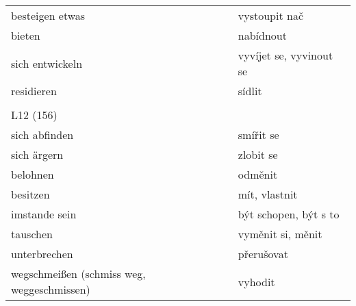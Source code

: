\documentclass{article}
\begin{document}
\begin{tabular}{ p{5cm}|p{5cm}  }
    besteigen etwas & vystoupit nač \\
    bieten & nabídnout \\
    sich entwickeln & vyvíjet se, vyvinout se \\
    residieren & sídlit \\
    \\
    L12 (156) \\
    sich abfinden & smířit se \\
    sich ärgern & zlobit se \\
    belohnen & odměnit \\
    besitzen & mít, vlastnit \\
    imstande sein & být schopen, být s to \\
    tauschen & vyměnit si, měnit \\
    unterbrechen & přerušovat \\
    wegschmei{\ss}en (schmiss weg, weggeschmissen) & vyhodit
 \end{tabular}
\end{document}
